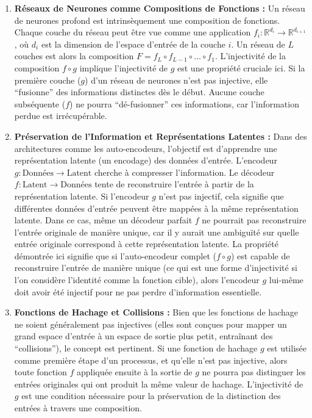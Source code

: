 \documentclass[12pt,a4paper]{report}
\begin{document}
\begin{enumerate}
\def\labelenumi{\arabic{enumi}.}
\item
  \textbf{Réseaux de Neurones comme Compositions de Fonctions :} Un
  réseau de neurones profond est intrinsèquement une composition de
  fonctions. Chaque couche du réseau peut être vue comme une application
  \(f_i: \mathbb{R}^{d_i} \to \mathbb{R}^{d_{i+1}}\), où \(d_i\) est la
  dimension de l'espace d'entrée de la couche \(i\). Un réseau de \(L\)
  couches est alors la composition
  \(F = f_L \circ f_{L-1} \circ \dots \circ f_1\). L'injectivité de la
  composition \(f \circ g\) implique l'injectivité de \(g\) est une
  propriété cruciale ici. Si la première couche (\(g\)) d'un réseau de
  neurones n'est pas injective, elle ``fusionne'' des informations
  distinctes dès le début. Aucune couche subséquente (\(f\)) ne pourra
  ``dé-fusionner'' ces informations, car l'information perdue est
  irrécupérable.
\item
  \textbf{Préservation de l'Information et Représentations Latentes :}
  Dans des architectures comme les auto-encodeurs, l'objectif est
  d'apprendre une représentation latente (un encodage) des données
  d'entrée. L'encodeur \(g: \text{Données} \to \text{Latent}\) cherche à
  compresser l'information. Le décodeur
  \(f: \text{Latent} \to \text{Données}\) tente de reconstruire l'entrée
  à partir de la représentation latente. Si l'encodeur \(g\) n'est pas
  injectif, cela signifie que différentes données d'entrée peuvent être
  mappées à la même représentation latente. Dans ce cas, même un
  décodeur parfait \(f\) ne pourrait pas reconstruire l'entrée originale
  de manière unique, car il y aurait une ambiguïté sur quelle entrée
  originale correspond à cette représentation latente. La propriété
  démontrée ici signifie que si l'auto-encodeur complet (\(f \circ g\))
  est capable de reconstruire l'entrée de manière unique (ce qui est une
  forme d'injectivité si l'on considère l'identité comme la fonction
  cible), alors l'encodeur \(g\) lui-même doit avoir été injectif pour
  ne pas perdre d'information essentielle.
\item
  \textbf{Fonctions de Hachage et Collisions :} Bien que les fonctions
  de hachage ne soient généralement pas injectives (elles sont conçues
  pour mapper un grand espace d'entrée à un espace de sortie plus petit,
  entraînant des ``collisions''), le concept est pertinent. Si une
  fonction de hachage \(g\) est utilisée comme première étape d'un
  processus, et qu'elle n'est pas injective, alors toute fonction \(f\)
  appliquée ensuite à la sortie de \(g\) ne pourra pas distinguer les
  entrées originales qui ont produit la même valeur de hachage.
  L'injectivité de \(g\) est une condition nécessaire pour la
  préservation de la distinction des entrées à travers une composition.
\end{enumerate}
\end{document}
